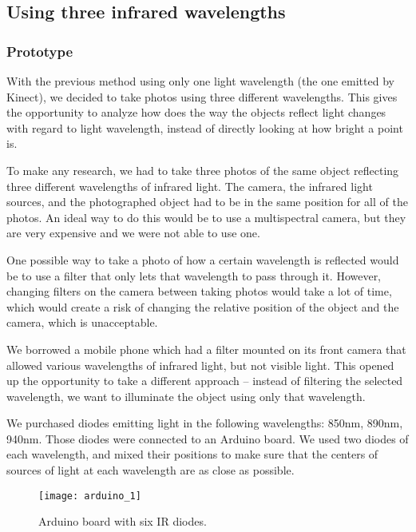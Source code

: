         \subsection{Using three infrared wavelengths}
            \subsubsection*{Prototype}
            With the previous method using only one light wavelength (the one emitted by
            Kinect), we decided to take photos using three different wavelengths.
            This gives the opportunity to analyze how does the way the objects reflect
            light changes with regard to light wavelength, instead of directly looking
            at how bright a point is.

            To make any research, we had to take three photos of the same object
            reflecting three different wavelengths of infrared light.
            The camera, the infrared light sources, and the photographed object
            had to be in the same position for all of the photos.
            An ideal way to do this would be to use a multispectral camera, but they are
            very expensive and we were not able to use one.

            One possible way to take a photo of how a certain wavelength is reflected
            would be to use a filter that only lets that wavelength to pass through it.
            However, changing filters on the camera between taking photos would take
            a lot of time, which would create a risk of changing the relative position
            of the object and the camera, which is unacceptable.

            We borrowed a mobile phone which had a filter mounted on its front camera
            that allowed various wavelengths of infrared light, but not visible light.
            This opened up the opportunity to take a different approach -- instead
            of filtering the selected wavelength, we want to illuminate the object
            using only that wavelength.

            We purchased diodes emitting light in the following wavelengths:
            850nm, 890nm, 940nm. Those diodes were connected to an Arduino board.
            We used two diodes of each wavelength, and mixed their positions to
            make sure that the centers of sources of light at each wavelength
            are as close as possible.

            \begin{figure}[H]
                \caption{Arduino board with six IR diodes.}
                \centering
                \texttt{[image: arduino\_1]}
                \label{fig:arduino_1}
            \end{figure}

